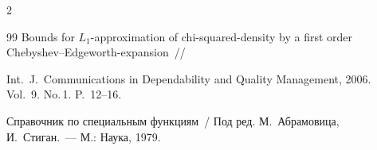 \begin{multicols}{2}
{{\begin{thebibliography}{99}
Bounds for $L_1$-approximation of chi-squared-density by a first order Chebyshev--Edgeworth-expansion~//


Int.\ J.~Communications in Dependability and Quality Management, 2006. Vol.~9. No.\,1. P.~12--16.





 \label{end\stat}







Справочник по специальным функциям~/ Под ред. М.~Абрамовица, И.~Стиган.~--- М.: Наука, 1979.








 \end{thebibliography}


}


}








\end{multicols}  


